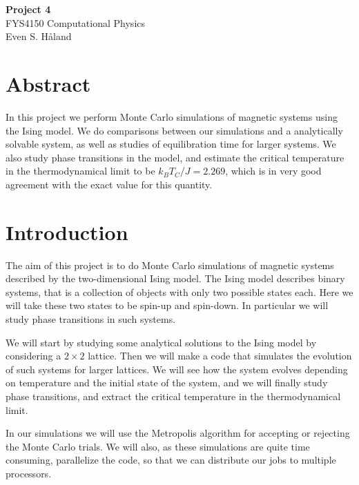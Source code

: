 \documentclass[12pt, a4paper]{article}
\begin{document}
\begin{titlepage}
\begin{center}
\vspace*{3cm}
\Huge
\textbf{Project 4} \\
\Large  
FYS4150 Computational Physics 
\vspace*{3cm} \\ 

Even S. Håland 
\vspace*{5cm} \\

\normalsize
\section*{Abstract}

In this project we perform Monte Carlo simulations of magnetic systems using the Ising model. We do 
comparisons between our simulations and a analytically solvable system, as well as studies of 
equilibration time for larger systems. We also study phase transitions in the model, and estimate 
the critical temperature in the thermodynamical limit to be $k_BT_C/J=2.269$, which is in very good 
agreement with the exact value for this quantity. 

\end{center}
\end{titlepage}

\section{Introduction}

The aim of this project is to do Monte Carlo simulations of magnetic systems described by the 
two-dimensional Ising model. The Ising model describes binary systems, that is a collection of objects 
with only two possible states each. Here we will take these two states to be spin-up and spin-down. In
particular we will study phase transitions in such systems. 

We will start by studying some analytical solutions to the Ising model by considering a $2\times 2$ 
lattice. Then we will make a code that simulates the evolution of such systems for larger lattices. We 
will see how the system evolves depending on temperature and the initial state of the system, and we 
will finally study phase transitions, and extract the critical temperature in the thermodynamical limit.  

In our simulations we will use the Metropolis algorithm for accepting or rejecting the Monte Carlo 
trials. We will also, as these simulations are quite time consuming, parallelize the code, so that 
we can distribute our jobs to multiple processors. 
\end{document}
